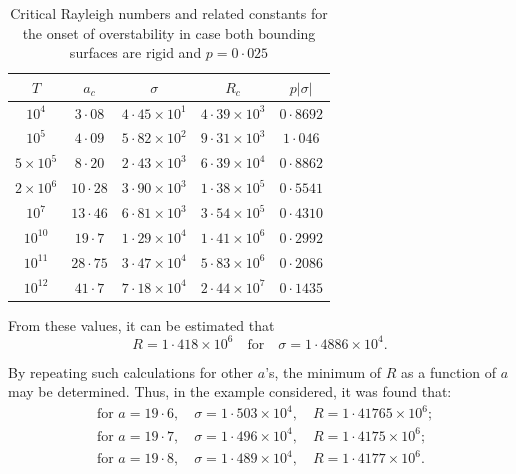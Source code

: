 \begin{table}[ht]
\centering
\caption{Critical Rayleigh numbers and related constants for the onset of overstability in case both bounding surfaces are rigid and $p = 0{\cdot}025$}
\label{tab:XII}
\small
\begin{tabular}{ccccc}
\hline
$T$ & $a_c$ & $\sigma$ & $R_c$ & $p|\sigma|$ \\
\hline
$10^4$ & $3{\cdot}08$ & $4{\cdot}45 \times 10^1$ & $4{\cdot}39 \times 10^3$ & $0{\cdot}8692$ \\
$10^5$ & $4{\cdot}09$ & $5{\cdot}82 \times 10^2$ & $9{\cdot}31 \times 10^3$ & $1{\cdot}046$ \\
$5 \times 10^5$ & $8{\cdot}20$ & $2{\cdot}43 \times 10^3$ & $6{\cdot}39 \times 10^4$ & $0{\cdot}8862$ \\
$2 \times 10^6$ & $10{\cdot}28$ & $3{\cdot}90 \times 10^3$ & $1{\cdot}38 \times 10^5$ & $0{\cdot}5541$ \\
$10^7$ & $13{\cdot}46$ & $6{\cdot}81 \times 10^3$ & $3{\cdot}54 \times 10^5$ & $0{\cdot}4310$ \\
$10^{10}$ & $19{\cdot}7$ & $1{\cdot}29 \times 10^4$ & $1{\cdot}41 \times 10^6$ & $0{\cdot}2992$ \\
$10^{11}$ & $28{\cdot}75$ & $3{\cdot}47 \times 10^4$ & $5{\cdot}83 \times 10^6$ & $0{\cdot}2086$ \\
$10^{12}$ & $41{\cdot}7$ & $7{\cdot}18 \times 10^4$ & $2{\cdot}44 \times 10^7$ & $0{\cdot}1435$ \\
\hline
\end{tabular}
\end{table}

From these values, it can be estimated that
\begin{equation}\label{eq:3-275}
R = 1{\cdot}418 \times 10^6 \quad \text{for} \quad \sigma = 1{\cdot}4886 \times 10^4.
\end{equation}

By repeating such calculations for other $a$'s, the minimum of $R$ as a function of $a$ may be determined. Thus, in the example considered, it was found that:
\begin{equation}\label{eq:3-276}
\begin{aligned}
&\text{for } a = 19{\cdot}6, \quad \sigma = 1{\cdot}503 \times 10^4, \quad R = 1{\cdot}41765 \times 10^6; \\
&\text{for } a = 19{\cdot}7, \quad \sigma = 1{\cdot}496 \times 10^4, \quad R = 1{\cdot}4175 \times 10^6; \\
&\text{for } a = 19{\cdot}8, \quad \sigma = 1{\cdot}489 \times 10^4, \quad R = 1{\cdot}4177 \times 10^6.
\end{aligned}
\end{equation}

